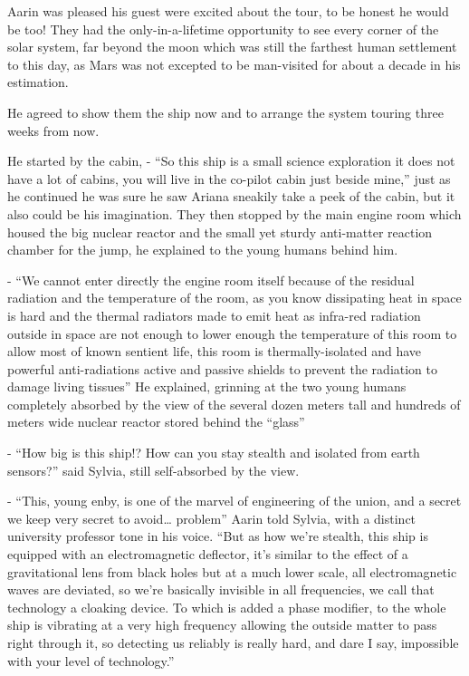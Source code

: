 \documentclass[hidelinks,12pt,a4paper]{book}
\begin{document}
Aarin was pleased his guest were excited about the tour, to be honest he would be too! They had the only-in-a-lifetime 
opportunity to see every corner of the solar system, far beyond the moon which was still the farthest human settlement 
to this day, as Mars was not excepted to be man-visited for about a decade in his estimation.\par
\bigskip

He agreed to show them the ship now and to arrange the system touring three weeks from now.\par
\bigskip


He started by the cabin, - “So this ship is a small science exploration it does not have a lot of cabins, you will live 
in the co-pilot cabin just beside mine,” just as he continued he was sure he saw Ariana sneakily take a peek of the 
cabin, but it also could be his imagination. They then stopped by the main engine room which housed the big nuclear 
reactor and the small yet sturdy anti-matter reaction chamber for the jump, he explained to the young humans behind him.\par
\bigskip

- “We cannot enter directly the engine room itself because of the residual radiation and the temperature of the
room, as you know dissipating heat in space is hard and the thermal radiators made to emit heat as infra-red radiation 
outside in space are not enough to lower enough the temperature of this room to allow most of known sentient life, 
this room is thermally-isolated and have powerful anti-radiations active and passive shields to prevent the 
radiation to damage living tissues” He explained, grinning at the two young humans completely absorbed by the view 
of the several dozen meters tall and hundreds of meters wide nuclear reactor stored behind the “glass”\par
\bigskip

- “How big is this ship!? How can you stay stealth and isolated from earth sensors?” said Sylvia, still self-absorbed by 
the view.\par
\bigskip

- “This, young enby, is one of the marvel of engineering of the union, and a secret we keep very secret to 
avoid… problem” Aarin told Sylvia, with a distinct university professor tone in his voice. “But as how we're stealth, 
this ship is equipped with an electromagnetic deflector, it's similar to the effect of a gravitational lens from black
 holes but at a much lower scale, all electromagnetic waves are deviated, so we're basically invisible in all 
 frequencies, we call that technology a cloaking device. To which is added a phase modifier, to the whole ship 
 is vibrating at a very high frequency allowing the outside matter to pass right through it, so detecting us 
 reliably is really hard, and dare I say, impossible with your level of technology.”\par
 \bigskip
\end{document}
